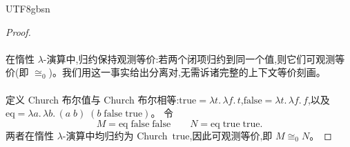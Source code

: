 \begin{CJK*}{UTF8}{gbsn}
\begin{proof}
  \paragraph{}
  在惰性 $\lambda$-演算中,归约保持观测等价:若两个闭项归约到同一个值,则它们可观测等价(即 $\cong_0$)。我们用这一事实给出分离对,无需诉诸完整的上下文等价刻画。

  \paragraph{}
  定义 Church 布尔值与 Church 布尔相等:$\mathrm{true} = \lambda t.\,\lambda f.\, t$,$\mathrm{false} = \lambda t.\,\lambda f.\, f$,以及 $\mathrm{eq} = \lambda a.\,\lambda b.\, (a\;b)\;(b\;\mathrm{false}\;\mathrm{true})$。
  令
  \[
    M = \mathrm{eq}\;\mathrm{false}\;\mathrm{false}
    \qquad
    N = \mathrm{eq}\;\mathrm{true}\;\mathrm{true}.
  \]
  两者在惰性 $\lambda$-演算中均归约为 Church~$\mathrm{true}$,因此可观测等价,即 $M \cong_0 N$。


\end{proof}
\end{CJK*}
